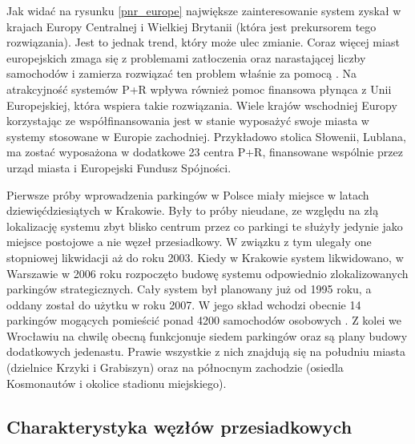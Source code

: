 \documentclass[twoside,12pt]{article}
\begin{document}
	Jak widać na rysunku \ref{pnr_europe} największe zainteresowanie system \pnr{} zyskał w krajach Europy Centralnej i Wielkiej Brytanii (która jest prekursorem tego rozwiązania). Jest to jednak trend, który może ulec zmianie. Coraz więcej miast europejskich zmaga się z problemami zatłoczenia oraz narastającej liczby samochodów i zamierza rozwiązać ten problem właśnie za pomocą \pnr{}. Na atrakcyjność systemów P+R wpływa również pomoc finansowa płynąca z Unii Europejskiej, która wspiera takie rozwiązania. Wiele krajów wschodniej Europy korzystając ze współfinansowania jest w stanie wyposażyć swoje miasta w systemy stosowane w Europie zachodniej. Przykładowo stolica Słowenii, Lublana, ma zostać wyposażona w dodatkowe 23 centra P+R, finansowane wspólnie przez urząd miasta i Europejski Fundusz Spójności. 
	
	
	Pierwsze próby wprowadzenia parkingów \pnr{} w Polsce miały miejsce w latach dziewięćdziesiątych w Krakowie. Były to próby nieudane, ze względu na złą lokalizację systemu zbyt blisko centrum przez co parkingi te służyły jedynie jako miejsce postojowe a nie węzeł przesiadkowy. W związku z tym ulegały one stopniowej likwidacji aż do roku 2003. Kiedy w Krakowie system likwidowano, w Warszawie w 2006 roku rozpoczęto budowę systemu odpowiednio zlokalizowanych parkingów strategicznych. Cały system był planowany już od 1995 roku, a oddany został do użytku w roku 2007. W jego skład wchodzi obecnie 14 parkingów mogących pomieścić ponad 4200 samochodów osobowych \cite{rybczynska}. Z kolei we Wrocławiu na chwilę obecną funkcjonuje siedem parkingów \pnr{} oraz są plany budowy dodatkowych jedenastu. Prawie wszystkie z nich znajdują się na południu miasta (dzielnice Krzyki i Grabiszyn) oraz na północnym zachodzie (osiedla Kosmonautów i okolice stadionu miejskiego).
	
	\subsection{Charakterystyka węzłów przesiadkowych}
	
\end{document}
